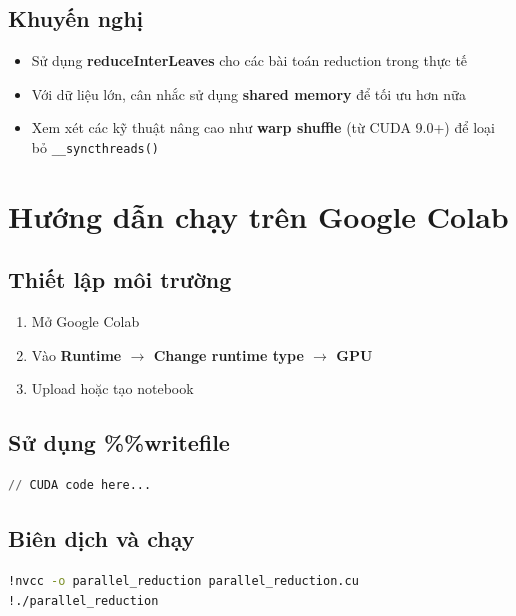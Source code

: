 \documentclass[12pt,a4paper]{article}
\begin{document}
\subsection{Khuyến nghị}

\begin{itemize}
    \item Sử dụng \textbf{reduceInterLeaves} cho các bài toán reduction trong thực tế
    \item Với dữ liệu lớn, cân nhắc sử dụng \textbf{shared memory} để tối ưu hơn nữa
    \item Xem xét các kỹ thuật nâng cao như \textbf{warp shuffle} (từ CUDA 9.0+) để loại bỏ \texttt{\_\_syncthreads()}
\end{itemize}

\section{Hướng dẫn chạy trên Google Colab}

\subsection{Thiết lập môi trường}

\begin{enumerate}
    \item Mở Google Colab
    \item Vào \textbf{Runtime $\rightarrow$ Change runtime type $\rightarrow$ GPU}
    \item Upload hoặc tạo notebook
\end{enumerate}

\subsection{Sử dụng \%\%writefile}

\begin{lstlisting}[language=Python, caption=Tạo file CUDA trên Colab]
%%writefile parallel_reduction.cu
// CUDA code here...
\end{lstlisting}

\subsection{Biên dịch và chạy}

\begin{lstlisting}[language=bash, caption=Biên dịch và chạy CUDA]
!nvcc -o parallel_reduction parallel_reduction.cu
!./parallel_reduction
\end{lstlisting}
\end{document}
